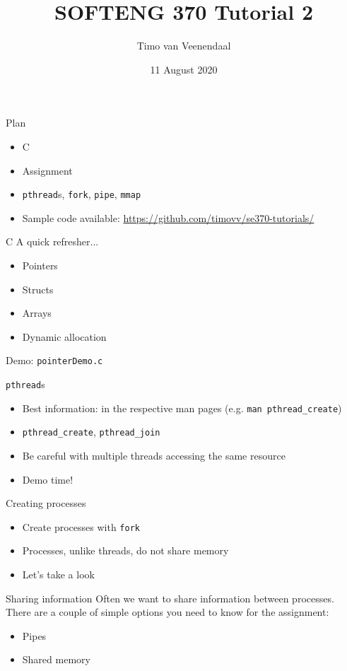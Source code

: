 \documentclass[notes]{beamer}
\title{SOFTENG 370 Tutorial 2}
\author{Timo van Veenendaal}
\date{11 August 2020}
\begin{document}
\maketitle

\begin{frame}{Plan}
    \begin{itemize}
	\item C
	\item Assignment
	\item \texttt{pthread}s, \texttt{fork}, \texttt{pipe}, \texttt{mmap}
	\item Sample code available: \url{https://github.com/timovv/se370-tutorials/}
    \end{itemize}
\end{frame}

\begin{frame}{C}
    A quick refresher...
    \begin{itemize}
	\item Pointers
	\item Structs
	\item Arrays
	\item Dynamic allocation
    \end{itemize}
    Demo: \texttt{pointerDemo.c}
\end{frame}

\begin{frame}{\texttt{pthread}s}
    \begin{itemize}
	\item Best information: in the respective man pages (e.g. \texttt{man pthread\_create})
	\item \texttt{pthread\_create}, \texttt{pthread\_join}
	\item Be careful with multiple threads accessing the same resource
	\item Demo time!
    \end{itemize}
\end{frame}

\begin{frame}{Creating processes}
    \begin{itemize}
	\pause
	\item Create processes with \texttt{fork}
	\item Processes, unlike threads, do not share memory
	\item Let's take a look
    \end{itemize}
\end{frame}

\begin{frame}{Sharing information}
    Often we want to share information between processes. There are a couple of simple options you need to know for the assignment:
    \begin{itemize}
	\item Pipes
	\item Shared memory
    \end{itemize}
\end{frame}
\end{document}
